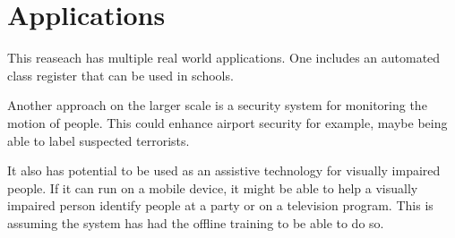 \section{Applications}
  This reaseach has multiple real world applications.
  One includes an automated class register that can be used in schools.

  Another approach on the larger scale is a security system for monitoring the motion of people.
  This could enhance airport security for example, maybe being able to label suspected terrorists.

  It also has potential to be used as an assistive technology for visually impaired people.
  If it can run on a mobile device, it might be able to help a visually impaired person identify people at a party or on a television program.
  This is assuming the system has had the offline training to be able to do so.
